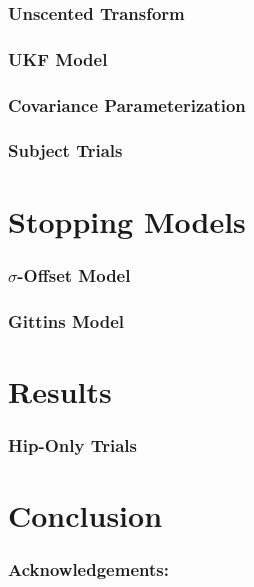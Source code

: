 \documentclass[compress, xcolor=pst]{beamer}
\newcommand\spacingset[1]{\renewcommand{\baselinestretch}%
{#1}\small\normalsize}
\begin{document}
\begin{frame}
	\frametitle{\textbf{Unscented Transform}}
\end{frame}

\begin{frame}
	\frametitle{\textbf{UKF Model}}
\end{frame}

\begin{frame}
	\frametitle{\textbf{Covariance Parameterization}}
\end{frame}

\begin{frame}
	\frametitle{\textbf{Subject Trials}}
\end{frame}

\section{Stopping Models}
\begin{frame}
	\frametitle{\textbf{$\sigma$-Offset Model}}
\end{frame}

\begin{frame}
	\frametitle{\textbf{Gittins Model}}
\end{frame}

\section{Results}
\begin{frame}
	\frametitle{\textbf{Hip-Only Trials}}
\end{frame}

\section{Conclusion}
\begin{frame}
	\frametitle{\textbf{Acknowledgements:}}
\end{frame}


\begin{comment}
\begin{frame}
\frametitle{\textbf{Include a graphic}}
\begin{figure}[htb]
\spacingset{1}
\centerline{\texttt{[image: data/postprocessing/AvatarSelectionPlot-Role2.pdf]}}
\end{figure}
\end{frame}
\end{comment}


%
\end{document}

